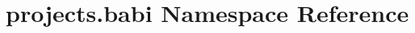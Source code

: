 \hypertarget{namespaceprojects_1_1babi}{}\section{projects.\+babi Namespace Reference}
\label{namespaceprojects_1_1babi}
